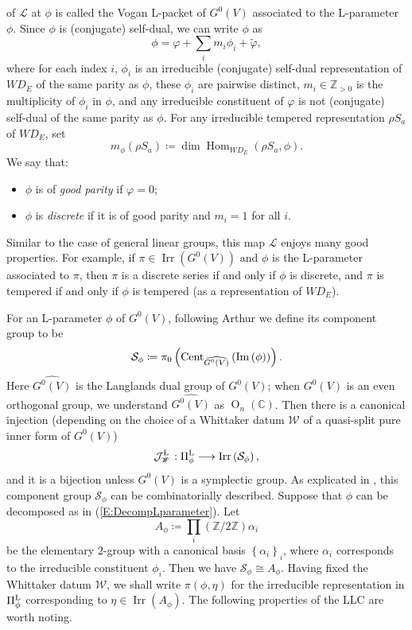 \documentclass[11pt,letterpaper]{amsart}
\theoremstyle{plain}
\numberwithin{theorem}{section}
\numberwithin{equation}{subsection}
\theoremstyle{remark}
\newcommand{\Hom}{\operatorname{Hom}}
\newcommand{\rO}{\operatorname{O}}
\newcommand{\Irr}{\operatorname{Irr}}
\newcommand{\C}{\mathbb{C}}
\newcommand{\Z}{\mathbb{Z}}
\def\calJ{\mathcal{J}}
\def\calL{\mathcal{L}}
\def\calS{\mathcal{S}}
\def\lra{\longrightarrow}
\def\LP{\Pi^{\rm L}} %
\begin{document}
of $\calL$ at $\phi$ is called the Vogan L-packet of $G^0(V)$ associated to the L-parameter $\phi$. Since $\phi$ is (conjugate) self-dual, we can write $\phi$ as
\begin{equation}\label{E:DecompLparameter}
    \phi = \varphi + \sum_i m_i\phi_i + \widetilde{\varphi},
\end{equation}
where for each index $i$, $\phi_i$ is an irreducible (conjugate) self-dual representation of $WD_E$ of the same parity as $\phi$, these $\phi_i$ are pairwise distinct, $m_i\in \Z_{>0}$ is the multiplicity of $\phi_i$ in $\phi$, and any irreducible constituent of $\varphi$ is not (conjugate) self-dual of the same parity as $\phi$. For any irreducible tempered representation $\rho S_a$ of $WD_E$, set
\[
    m_\phi\left(\rho S_a\right) \coloneqq \dim \Hom_{WD_E}\left(\rho S_a, \phi\right).
\]
We say that:
\begin{itemize}
    \item $\phi$ is of \emph{good parity} if $\varphi=0$;

    \vskip 5pt

    \item $\phi$ is \emph{discrete} if it is of good parity and $m_i=1$ for all $i$.
\end{itemize}
Similar to the case of general linear groups, this map $\calL$ enjoys many good properties. For example, if $\pi\in\Irr\left(G^0(V)\right)$ and $\phi$ is the L-parameter associated to $\pi$, then $\pi$ is a discrete series if and only if $\phi$ is discrete, and $\pi$ is tempered if and only if $\phi$ is tempered (as a representation of $WD_E$). 

\vskip 5pt

For an L-parameter $\phi$ of $G^0(V)$, following Arthur \cite[Sect. 1.4]{MR3135650} we define its component group to be
\[
    \calS_\phi \coloneqq \pi_0\left({\rm Cent}_{\widehat{G^0(V)}}\left({\rm Im}\left(\phi\right)\right)\right).
\]
Here $\widehat{G^0(V)}$ is the Langlands dual group of $G^0(V)$; when $G^0(V)$ is an even orthogonal group, we understand $\widehat{G^0(V)}$ as $\rO_n(\C)$. Then there is a canonical injection (depending on the choice of a Whittaker datum $\mathscr{W}$ of a quasi-split pure inner form of $G^0(V)$)
\[
    \calJ^{\rm L}_{\mathscr{W}}: \LP_\phi \lra \Irr\left(\calS_\phi\right),
\]
and it is a bijection unless $G^0(V)$ is a symplectic group. As explicated in \cite[Sect. 8]{MR3202556}, this component group $\calS_\phi$ can be combinatorially described. Suppose that $\phi$ can be decomposed as in (\ref{E:DecompLparameter}). Let
\[
    A_\phi \coloneqq \prod_i \left(\Z/2\Z\right) \alpha_i
\]
be the elementary $2$-group with a canonical basis $\left\{\alpha_i\right\}_i$, where $\alpha_i$ corresponds to the irreducible constituent $\phi_i$. %
Then we have $\calS_\phi\cong A_\phi$. Having fixed the Whittaker datum $\mathscr{W}$, we shall write $\pi\left(\phi,\eta\right)$ for the irreducible representation in $\LP_\phi$ corresponding to $\eta\in\Irr\left(A_\phi\right)$. The following properties of the LLC are worth noting.
\end{document}
